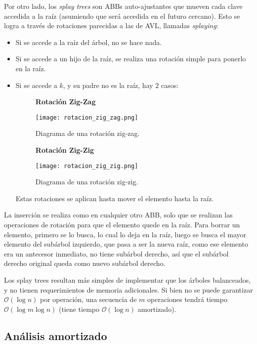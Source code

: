 \documentclass{article}
\newcommand{\BigO}[1]{{\mathcal{O}(#1)}}
\begin{document}
Por otro lado, los \textit{splay trees} son ABBs auto-ajustantes que mueven cada clave accedida a la raíz (asumiendo que será accedida en el futuro cercano). Esto se logra a través de rotaciones parecidas a las de AVL, llamadas \textit{splaying}:
\begin{itemize}
    \item Si se accede a la raíz del árbol, no se hace nada.
    \item Si se accede a un hijo de la raíz, se realiza una rotación simple para ponerlo en la raíz.
    \item Si se accede a $k$, y su padre no es la raíz, hay $2$ casos:
          \begin{figure}[H]
              \centering
              \textbf{Rotación Zig-Zag}\par\medskip
              \texttt{[image: rotacion\_zig\_zag.png]}
              \caption*{Diagrama de una rotación zig-zag.}
          \end{figure}
          \begin{figure}[H]
              \centering
              \textbf{Rotación Zig-Zig}\par\medskip
              \texttt{[image: rotacion\_zig\_zig.png]}
              \caption*{Diagrama de una rotación zig-zig.}
          \end{figure}
          Estas rotaciones se aplican hasta mover el elemento hasta la raíz.
\end{itemize}

La inserción se realiza como en cualquier otro ABB, solo que se realizan las operaciones de rotación para que el elemento quede en la raíz. Para borrar un elemento, primero se lo busca, lo cual lo deja en la raíz, luego se busca el mayor elemento del subárbol izquierdo, que pasa a ser la nueva raíz, como ese elemento era un antecesor inmediato, no tiene subárbol derecho, así que el subárbol derecho original queda como nuevo subárbol derecho.

Los splay trees resultan más simples de implementar que los árboles balanceados, y no tienen requerimientos de memoria adicionales. Si bien no se puede garantizar $\BigO{\log{n}}$ por operación, una secuencia de $m$ operaciones tendrá tiempo $\BigO{\log{m\log{n}}}$ (tiene tiempo $\BigO{\log{n}}$ amortizado).

\subsection{Análisis amortizado}
\end{document}
